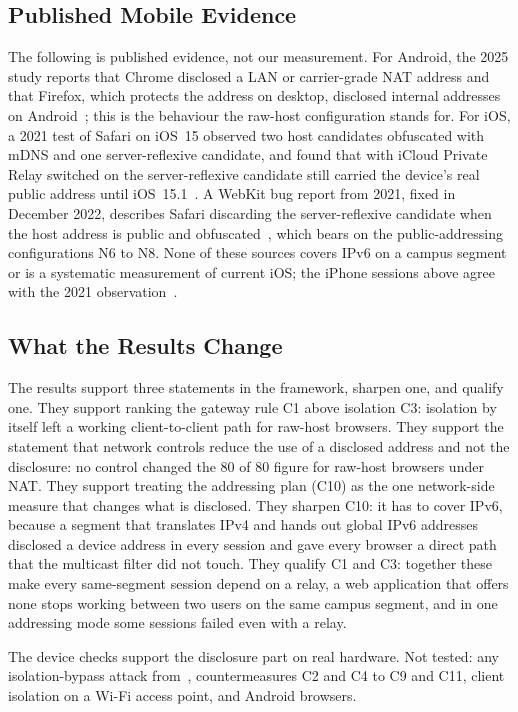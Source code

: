 \documentclass[conference]{IEEEtran}
\begin{document}
\subsection{Published Mobile Evidence}
\label{sec:mobile}
The following is published evidence, not our measurement. For Android, the 2025 study reports that Chrome disclosed a LAN or carrier-grade NAT address and that Firefox, which protects the address on desktop, disclosed internal addresses on Android~\cite{koysha2025}; this is the behaviour the raw-host configuration stands for. For iOS, a 2021 test of Safari on iOS~15 observed two host candidates obfuscated with mDNS and one server-reflexive candidate, and found that with iCloud Private Relay switched on the server-reflexive candidate still carried the device's real public address until iOS~15.1~\cite{hancke2021}. A WebKit bug report from 2021, fixed in December 2022, describes Safari discarding the server-reflexive candidate when the host address is public and obfuscated~\cite{webkit233414}, which bears on the public-addressing configurations N6 to N8. None of these sources covers IPv6 on a campus segment or is a systematic measurement of current iOS; the iPhone sessions above agree with the 2021 observation~\cite{hancke2021}.

\subsection{What the Results Change}
The results support three statements in the framework, sharpen one, and qualify one. They support ranking the gateway rule C1 above isolation C3: isolation by itself left a working client-to-client path for raw-host browsers. They support the statement that network controls reduce the use of a disclosed address and not the disclosure: no control changed the 80 of 80 figure for raw-host browsers under NAT. They support treating the addressing plan (C10) as the one network-side measure that changes what is disclosed. They sharpen C10: it has to cover IPv6, because a segment that translates IPv4 and hands out global IPv6 addresses disclosed a device address in every session and gave every browser a direct path that the multicast filter did not touch. They qualify C1 and C3: together these make every same-segment session depend on a relay, a web application that offers none stops working between two users on the same campus segment, and in one addressing mode some sessions failed even with a relay.

The device checks support the disclosure part on real hardware. Not tested: any isolation-bypass attack from~\cite{framingframes2023,airsnitch2026}, countermeasures C2 and C4 to C9 and C11, client isolation on a Wi-Fi access point, and Android browsers.
\end{document}

